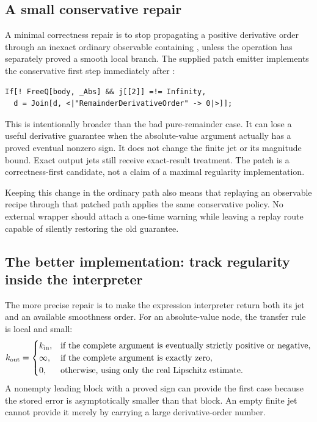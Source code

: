 \documentclass[11pt,a4paper]{article}
\newcommand{\code}[1]{\texttt{\detokenize{#1}}}
\begin{document}
\subsection{A small conservative repair}
A minimal correctness repair is to stop propagating a positive derivative order
through an inexact ordinary observable containing \code{Abs}, unless the
operation has separately proved a smooth local branch. The supplied patch emitter
implements the conservative first step immediately after \code{seriesJetApply}:
\begin{lstlisting}
If[! FreeQ[body, _Abs] && j[[2]] =!= Infinity,
  d = Join[d, <|"RemainderDerivativeOrder" -> 0|>]];
\end{lstlisting}
This is intentionally broader than the bad pure-remainder case. It can lose a
useful derivative guarantee when the absolute-value argument actually has a
proved eventual nonzero sign. It does not change the finite jet or its magnitude
bound. Exact output jets still receive exact-result treatment. The patch is a
correctness-first candidate, not a claim of a maximal regularity implementation.

Keeping this change in the ordinary \code{SeriesObservable} path also means that
replaying an observable recipe through that patched path applies the same
conservative policy. No external wrapper should attach a one-time warning while
leaving a replay route capable of silently restoring the old guarantee.

\subsection{The better implementation: track regularity inside the interpreter}
The more precise repair is to make the expression interpreter return both its
jet and an available smoothness order. For an absolute-value node, the transfer
rule is local and small:
\begin{equation}\label{eq:abs-policy}
 k_{\rm out}=\begin{cases}
 k_{\rm in},&\text{if the complete argument is eventually strictly positive or negative},\\
 \infty,&\text{if the complete argument is exactly zero},\\
 0,&\text{otherwise, using only the real Lipschitz estimate}.
 \end{cases}
\end{equation}
A nonempty leading block with a proved sign can provide the first case because
the stored error is asymptotically smaller than that block. An empty finite jet
cannot provide it merely by carrying a large derivative-order number.
\end{document}
